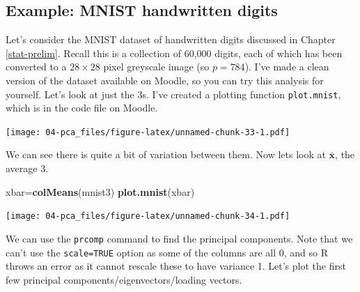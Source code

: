 \documentclass[]{book}
\newenvironment{Shaded}{\begin{snugshade}}{\end{snugshade}}
\newcommand{\CommentTok}[1]{\textcolor[rgb]{0.56,0.35,0.01}{\textit{#1}}}
\newcommand{\DataTypeTok}[1]{\textcolor[rgb]{0.13,0.29,0.53}{#1}}
\newcommand{\DecValTok}[1]{\textcolor[rgb]{0.00,0.00,0.81}{#1}}
\newcommand{\KeywordTok}[1]{\textcolor[rgb]{0.13,0.29,0.53}{\textbf{#1}}}
\newcommand{\NormalTok}[1]{#1}
\newcommand{\OperatorTok}[1]{\textcolor[rgb]{0.81,0.36,0.00}{\textbf{#1}}}
\newcommand{\StringTok}[1]{\textcolor[rgb]{0.31,0.60,0.02}{#1}}
\theoremstyle{definition}
\theoremstyle{definition}
\theoremstyle{definition}
\theoremstyle{remark}
\begin{document}
\hypertarget{example-mnist-handwritten-digits}{%
\subsection{Example: MNIST handwritten digits}\label{example-mnist-handwritten-digits}}

Let's consider the MNIST dataset of handwritten digits discussed in Chapter \ref{stat-prelim}. Recall this is a collection of 60,000 digits, each of which has been converted to a \(28\times 28\) pixel greyscale image (so \(p=784\)).
I've made a clean version of the dataset available on Moodle, so you can try this analysis for yourself. Let's look at just the 3s. I've created a plotting function \texttt{plot.mnist}, which is in the code file on Moodle.

\begin{Shaded}
\end{Shaded}

\texttt{[image: 04-pca\_files/figure-latex/unnamed-chunk-33-1.pdf]}

We can see there is quite a bit of variation between them.
Now lets look at \(\bar{\boldsymbol x}\), the average 3.

\begin{Shaded}
\begin{Highlighting}[]
\NormalTok{xbar=}\KeywordTok{colMeans}\NormalTok{(mnist3)}
\KeywordTok{plot.mnist}\NormalTok{(xbar)}
\end{Highlighting}
\end{Shaded}

\texttt{[image: 04-pca\_files/figure-latex/unnamed-chunk-34-1.pdf]}

We can use the \texttt{prcomp} command to find the principal components. Note that we can't use the \texttt{scale=TRUE} option as some of the columns are all 0, and so R throws an error as it cannot rescale these to have variance 1. Let's plot the first few principal components/eigenvectors/loading vectors.
\end{document}
